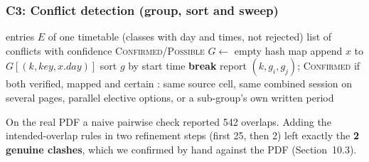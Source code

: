 \subsubsection{C3: Conflict detection (group, sort and sweep)}
\begin{algorithm}[H]
\caption{Detect professor, room and batch clashes}\label{alg:conflict}
\begin{algorithmic}[1]
\Require entries $E$ of one timetable (classes with day and times, not rejected)
\Ensure list of conflicts with confidence \textsc{Confirmed}/\textsc{Possible}
\State $G \gets$ empty hash map
     \State append $x$ to $G[(k, \mathit{key}, x.\mathit{day})]$ 
  \EndFor
\EndFor
{}
   \State sort $g$ by start time
         \textbf{break} \EndIf
            \State report $(k, g_i, g_j)$; \textsc{Confirmed} if both verified, mapped and certain
        \EndIf
     \EndFor
   \EndFor
\EndFor
{}: same source cell, same combined session on several pages, parallel
elective options, or a sub-group's own written period \EndFunction
\end{algorithmic}
\end{algorithm}
On the real PDF a naive pairwise check reported 542 overlaps. Adding the intended-overlap rules in
two refinement steps (first 25, then 2) left exactly the \textbf{2 genuine clashes}, which we
confirmed by hand against the PDF (Section~10.3).

